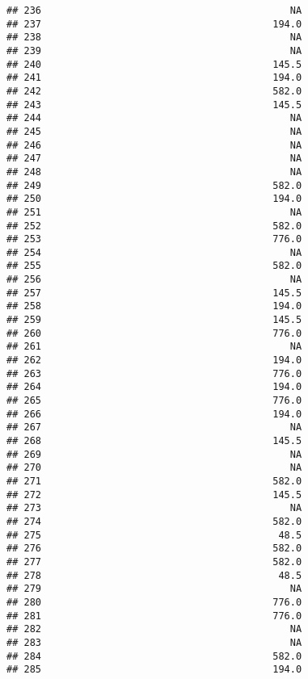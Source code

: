 \documentclass[
]{article}
\begin{document}
\begin{verbatim}
## 236                                           NA
## 237                                        194.0
## 238                                           NA
## 239                                           NA
## 240                                        145.5
## 241                                        194.0
## 242                                        582.0
## 243                                        145.5
## 244                                           NA
## 245                                           NA
## 246                                           NA
## 247                                           NA
## 248                                           NA
## 249                                        582.0
## 250                                        194.0
## 251                                           NA
## 252                                        582.0
## 253                                        776.0
## 254                                           NA
## 255                                        582.0
## 256                                           NA
## 257                                        145.5
## 258                                        194.0
## 259                                        145.5
## 260                                        776.0
## 261                                           NA
## 262                                        194.0
## 263                                        776.0
## 264                                        194.0
## 265                                        776.0
## 266                                        194.0
## 267                                           NA
## 268                                        145.5
## 269                                           NA
## 270                                           NA
## 271                                        582.0
## 272                                        145.5
## 273                                           NA
## 274                                        582.0
## 275                                         48.5
## 276                                        582.0
## 277                                        582.0
## 278                                         48.5
## 279                                           NA
## 280                                        776.0
## 281                                        776.0
## 282                                           NA
## 283                                           NA
## 284                                        582.0
## 285                                        194.0

\end{verbatim}
\end{document}
